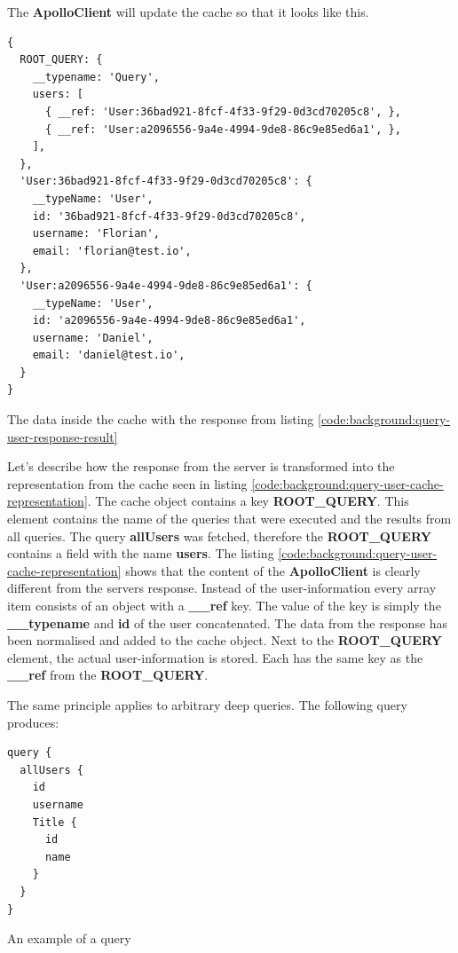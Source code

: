 The \textbf{ApolloClient} will update the cache so that it looks like this.

\ifshowListings
\begin{listing}[H]
\begin{verbatim}
{
  ROOT_QUERY: {
    __typename: 'Query',
    users: [
      { __ref: 'User:36bad921-8fcf-4f33-9f29-0d3cd70205c8', },
      { __ref: 'User:a2096556-9a4e-4994-9de8-86c9e85ed6a1', },
    ],
  },
  'User:36bad921-8fcf-4f33-9f29-0d3cd70205c8': {
    __typeName: 'User',
    id: '36bad921-8fcf-4f33-9f29-0d3cd70205c8',
    username: 'Florian',
    email: 'florian@test.io',
  },
  'User:a2096556-9a4e-4994-9de8-86c9e85ed6a1': {
    __typeName: 'User',
    id: 'a2096556-9a4e-4994-9de8-86c9e85ed6a1',
    username: 'Daniel',
    email: 'daniel@test.io',
  }
}
\end{verbatim}
\caption{The data inside the cache with the response from listing \ref{code:background:query-user-response-result}}\label{code:background:query-user-cache-representation}
\end{listing}
\fi

Let's describe how the response from the server is transformed into the representation from the cache seen in listing \ref{code:background:query-user-cache-representation}. The cache object contains a key \textbf{ROOT\_QUERY}. This element contains the name of the queries that were executed and the results from all queries. The query \textbf{allUsers} was fetched, therefore the \textbf{ROOT\_QUERY} contains a field with the name \textbf{users}. The listing \ref{code:background:query-user-cache-representation} shows that the content of the \textbf{ApolloClient} is clearly different from the servers response. Instead of the user-information every array item consists of an object with a \textbf{\_\_ref} key. The value of the key is simply the \textbf{\_\_typename} and \textbf{id} of the user concatenated. The data from the response has been normalised and added to the cache object. Next to the \textbf{ROOT\_QUERY} element, the actual user-information is stored. Each has the same key as the \textbf{\_\_ref} from the \textbf{ROOT\_QUERY}. 

The same principle applies to arbitrary deep queries. The following query produces:

\ifshowListings
\begin{listing}[H]
\begin{verbatim}
query {
  allUsers {
    id
    username
    Title {
      id
      name
    }
  }
}
\end{verbatim}
\caption{An example of a query}\label{code:background:nested-query-user-cache}
\end{listing}
\fi

